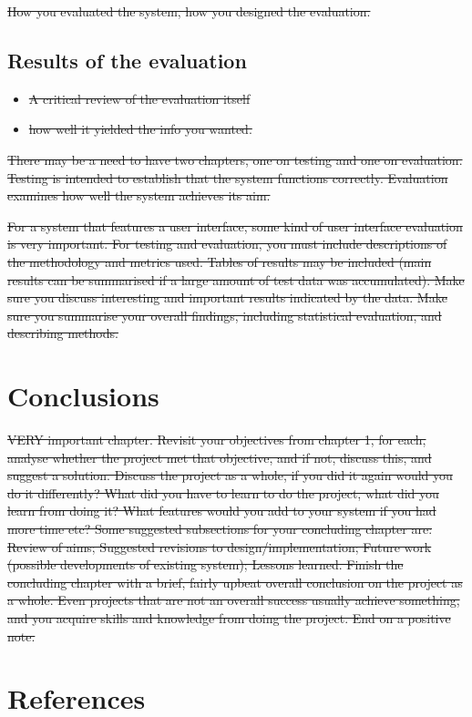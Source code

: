 \documentclass[12pt,a4paper,]{book}
\begin{document}
\sout{How you evaluated the system, how you designed the evaluation.}

\subsection{Results of the evaluation}\label{results-of-the-evaluation}

\begin{itemize}
\itemsep1pt\parskip0pt
\item
  \sout{A critical review of the evaluation itself}
\item
  \sout{how well it yielded the info you wanted.}
\end{itemize}

\sout{There may be a need to have two chapters, one on testing and one
on evaluation. Testing is intended to establish that the system
functions correctly. Evaluation examines how well the system achieves
its aim.}

\sout{For a system that features a user interface, some kind of user
interface evaluation is very important. For testing and evaluation, you
must include descriptions of the methodology and metrics used. Tables of
results may be included (main results can be summarised if a large
amount of test data was accumulated). Make sure you discuss interesting
and important results indicated by the data. Make sure you summarise
your overall findings, including statistical evaluation, and describing
methods.}

\section{Conclusions}\label{conclusions}

\sout{VERY important chapter. Revisit your objectives from chapter 1,
for each, analyse whether the project met that objective, and if not,
discuss this, and suggest a solution. Discuss the project as a whole, if
you did it again would you do it differently? What did you have to learn
to do the project, what did you learn from doing it? What features would
you add to your system if you had more time etc? Some suggested
subsections for your concluding chapter are: Review of aims; Suggested
revisions to design/implementation; Future work (possible developments
of existing system); Lessons learned. Finish the concluding chapter with
a brief, fairly upbeat overall conclusion on the project as a whole.
Even projects that are not an overall success usually achieve something,
and you acquire skills and knowledge from doing the project. End on a
positive note.}

\section{References}\label{references}
\end{document}
